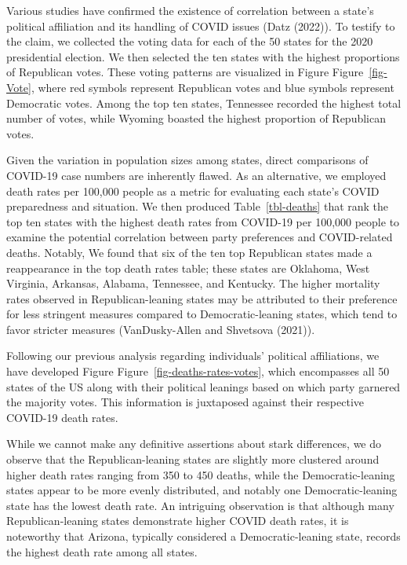 \documentclass[
  letterpaper,
  DIV=11,
  numbers=noendperiod]{scrartcl}
\begin{document}
Various studies have confirmed the existence of correlation between a
state's political affiliation and its handling of COVID issues (Datz
(2022)). To testify to the claim, we collected the voting data for each
of the 50 states for the 2020 presidential election. We then selected
the ten states with the highest proportions of Republican votes. These
voting patterns are visualized in Figure Figure~\ref{fig-Vote}, where
red symbols represent Republican votes and blue symbols represent
Democratic votes. Among the top ten states, Tennessee recorded the
highest total number of votes, while Wyoming boasted the highest
proportion of Republican votes.

Given the variation in population sizes among states, direct comparisons
of COVID-19 case numbers are inherently flawed. As an alternative, we
employed death rates per 100,000 people as a metric for evaluating each
state's COVID preparedness and situation. We then produced
Table~\ref{tbl-deaths} that rank the top ten states with the highest
death rates from COVID-19 per 100,000 people to examine the potential
correlation between party preferences and COVID-related deaths. Notably,
We found that six of the ten top Republican states made a reappearance
in the top death rates table; these states are Oklahoma, West Virginia,
Arkansas, Alabama, Tennessee, and Kentucky. The higher mortality rates
observed in Republican-leaning states may be attributed to their
preference for less stringent measures compared to Democratic-leaning
states, which tend to favor stricter measures (VanDusky-Allen and
Shvetsova (2021)).

Following our previous analysis regarding individuals' political
affiliations, we have developed Figure
Figure~\ref{fig-deaths-rates-votes}, which encompasses all 50 states of
the US along with their political leanings based on which party garnered
the majority votes. This information is juxtaposed against their
respective COVID-19 death rates.

While we cannot make any definitive assertions about stark differences,
we do observe that the Republican-leaning states are slightly more
clustered around higher death rates ranging from 350 to 450 deaths,
while the Democratic-leaning states appear to be more evenly
distributed, and notably one Democratic-leaning state has the lowest
death rate. An intriguing observation is that although many
Republican-leaning states demonstrate higher COVID death rates, it is
noteworthy that Arizona, typically considered a Democratic-leaning
state, records the highest death rate among all states.
\end{document}
